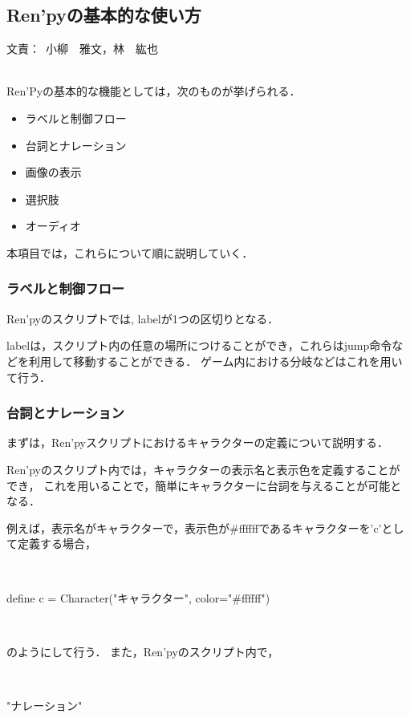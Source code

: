 \documentclass[a4paper]{jarticle}
\newcommand{\resp}[1]{\begin{flushright}文責：~#1\end{flushright}~\\}
\begin{document}
\fi

\subsection{Ren'pyの基本的な使い方}
  \resp{小柳　雅文，林　紘也}

  Ren'Pyの基本的な機能としては，次のものが挙げられる．

  \begin{itemize}
    \item ラベルと制御フロー
    \item 台詞とナレーション
    \item 画像の表示
    \item 選択肢
    \item オーディオ
  \end{itemize}

  本項目では，これらについて順に説明していく．

  \subsubsection{ラベルと制御フロー}

    Ren'pyのスクリプトでは, labelが1つの区切りとなる．
    
    labelは，スクリプト内の任意の場所につけることができ，これらはjump命令などを利用して移動することができる．
    ゲーム内における分岐などはこれを用いて行う．

  \subsubsection{台詞とナレーション}

    まずは，Ren'pyスクリプトにおけるキャラクターの定義について説明する．

    Ren'pyのスクリプト内では，キャラクターの表示名と表示色を定義することができ，
    これを用いることで，簡単にキャラクターに台詞を与えることが可能となる．

    例えば，表示名がキャラクターで，表示色が\#ffffffであるキャラクターを'c'として定義する場合，

    ~

    define c = Character("キャラクター", color="\#ffffff")

    ~

    のようにして行う．
    また，Ren'pyのスクリプト内で，

    ~

    "ナレーション"

    ~
\end{document}
